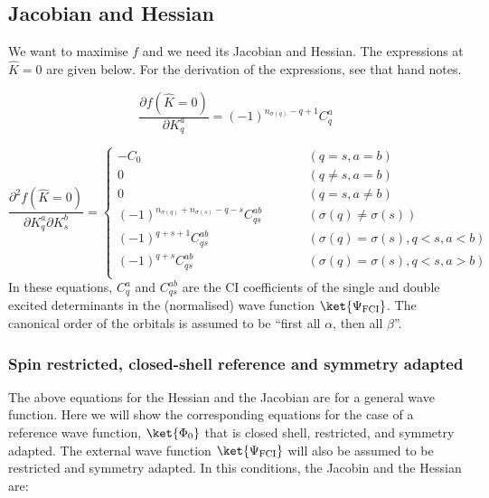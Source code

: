 \documentclass[a4paper,11pt]{article}
\begin{document}
\subsection{Jacobian and Hessian}

We want to maximise $f$ and we need its Jacobian and Hessian.
The expressions at $\hat{K} = 0$ are given below.
For the derivation of the expressions, see that hand notes.

\begin{equation}
  \frac{\partial f(\hat{K} = 0)}{\partial K_q^a} = (-1)^{n_{\sigma(q)} - q + 1} C_q^a
\end{equation}

\begin{equation}
  \frac{\partial^2 f(\hat{K} = 0)}{\partial K_q^a \partial K_s^b} =
  \left\{
    \begin{array}{lcr}
      -C_0 & \quad\quad & (q = s, a = b)\\
      0   &  \quad\quad & (q \ne s, a = b)\\
      0   &  \quad\quad & (q = s, a \ne b)\\
      (-1)^{n_{\sigma(q)}+n_{\sigma(s)}-q-s}C_{qs}^{ab} & \quad\quad & (\sigma(q) \ne \sigma(s))\\
      (-1)^{q+s+1}C_{qs}^{ab} & \quad\quad & (\sigma(q) = \sigma(s), q<s, a<b)\\
      (-1)^{q+s}C_{qs}^{ab} & \quad\quad & (\sigma(q) = \sigma(s), q<s, a>b)\\
    \end{array}
  \right.
\end{equation}
In these equations, $C_q^a$ and $C_{qs}^{ab}$ are the CI coefficients of the single and double excited determinants in the (normalised) wave function $\ket{\Psi_\text{FCI}}$.
The canonical order of the orbitals is assumed to be ``first all $\alpha$, then all $\beta$''.

\subsubsection{Spin restricted, closed-shell reference and symmetry adapted}

The above equations for the Hessian and the Jacobian are for a general wave function.
Here we will show the corresponding equations for the case of a reference wave function, $\ket{\Phi_0}$ that is closed shell, restricted, and symmetry adapted.
The external wave function $\ket{\Psi_\text{FCI}}$ will also be assumed to be restricted and symmetry adapted.
In this conditions, the Jacobin and the Hessian are:
\end{document}
